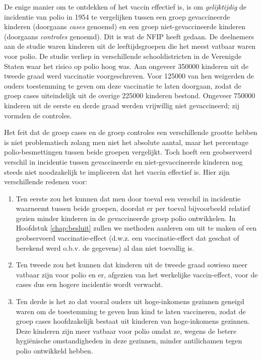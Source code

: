 \documentclass[12pt,dutch,coursenotes]{book}
\providecommand{\tightlist}{%
  \setlength{\itemsep}{0pt}\setlength{\parskip}{0pt}}
\theoremstyle{definition}
\theoremstyle{definition}
\theoremstyle{definition}
\theoremstyle{remark}
\begin{document}
De enige manier om te ontdekken of het vaccin effectief is, is om
\emph{gelijktijdig} de incidentie van polio in 1954 te vergelijken
tussen een groep gevaccineerde kinderen (doorgaans \emph{cases} genoemd)
en een groep niet-gevaccineerde kinderen (doorgaans \emph{controles}
genoemd). Dit is wat de NFIP heeft gedaan. De deelnemers aan de studie
waren kinderen uit de leeftijdsgroepen die het meest vatbaar waren voor
polio. De studie verliep in verschillende schooldistricten in de
Verenigde Staten waar het risico op polio hoog was. Aan ongeveer 350000
kinderen uit de tweede graad werd vaccinatie voorgeschreven. Voor 125000
van hen weigerden de ouders toestemming te geven om deze vaccinatie te
laten doorgaan, zodat de groep cases uiteindelijk uit de overige 225000
kinderen bestond. Ongeveer 750000 kinderen uit de eerste en derde graad
werden vrijwillig niet gevaccineerd; zij vormden de controles.

Het feit dat de groep cases en de groep controles een verschillende
grootte hebben is niet problematisch zolang men niet het absolute
aantal, maar het percentage polio-besmettingen tussen beide groepen
vergelijkt. Toch hoeft een geobserveerd verschil in incidentie tussen
gevaccineerde en niet-gevaccineerde kinderen nog steeds niet
noodzakelijk te impliceren dat het vaccin effectief is. Hier zijn
verschillende redenen voor:

\begin{enumerate}
\def\labelenumi{\arabic{enumi}.}
\tightlist
\item
  Ten eerste zou het kunnen dat men door toeval een verschil in
  incidentie waarneemt tussen beide groepen, doordat er per toeval
  bijvoorbeeld relatief gezien minder kinderen in de gevaccineerde groep
  polio ontwikkelen. In Hoofdstuk \ref{chap:besluit} zullen we methoden
  aanleren om uit te maken of een geobserveerd vaccinatie-effect (d.w.z.
  een vaccinatie-effect dat geschat of berekend werd o.b.v. de gegevens)
  al dan niet toevallig is.
\item
  Ten tweede zou het kunnen dat kinderen uit de tweede graad sowieso
  meer vatbaar zijn voor polio en er, afgezien van het werkelijke
  vaccin-effect, voor de cases dus een hogere incidentie wordt verwacht.
\item
  Ten derde is het zo dat vooral ouders uit hoge-inkomens gezinnen
  geneigd waren om de toestemming te geven hun kind te laten vaccineren,
  zodat de groep cases hoofdzakelijk bestaat uit kinderen van
  hoge-inkomens gezinnen. Deze kinderen zijn meer vatbaar voor polio
  omdat ze, wegens de betere hygiënische omstandigheden in deze
  gezinnen, minder antilichamen tegen polio ontwikkeld hebben.
\end{enumerate}
\end{document}
